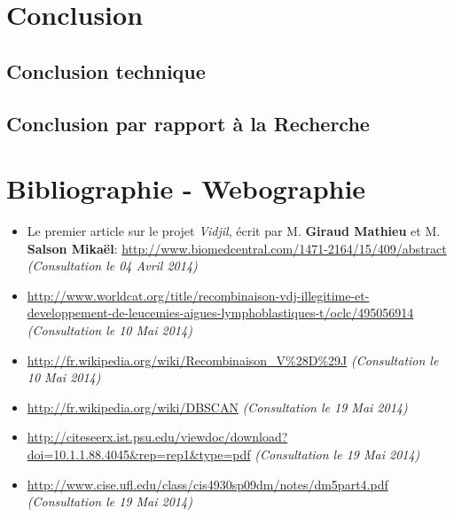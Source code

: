 \documentclass[12pt]{report}
\begin{document}
\begin{spacing}{1.2}
\chapter{Conclusion}

\section{Conclusion technique}

\section{Conclusion par rapport à la Recherche}

\chapter*{Bibliographie - Webographie}


\begin{itemize}
\item{Le premier article sur le projet \textit{Vidjil}, écrit par M. \textbf{Giraud Mathieu} et M. \textbf{Salson Mikaël}: \url{http://www.biomedcentral.com/1471-2164/15/409/abstract} \textit{(Consultation le 04 Avril 2014)}}
\item{\url{http://www.worldcat.org/title/recombinaison-vdj-illegitime-et-developpement-de-leucemies-aigues-lymphoblastiques-t/oclc/495056914} \textit{(Consultation le 10 Mai 2014)}}
\item{\url{http://fr.wikipedia.org/wiki/Recombinaison_V%28D%29J} \textit{(Consultation le 10 Mai 2014)}}
\item{\url{http://fr.wikipedia.org/wiki/DBSCAN} \textit{(Consultation le 19 Mai 2014)}}
\item{\url{http://citeseerx.ist.psu.edu/viewdoc/download?doi=10.1.1.88.4045&rep=rep1&type=pdf} \textit{(Consultation le 19 Mai 2014)}}
\item{\url{http://www.cise.ufl.edu/class/cis4930sp09dm/notes/dm5part4.pdf} \textit{(Consultation le 19 Mai 2014)}}
\end{itemize}

\end{spacing}
\end{document}
